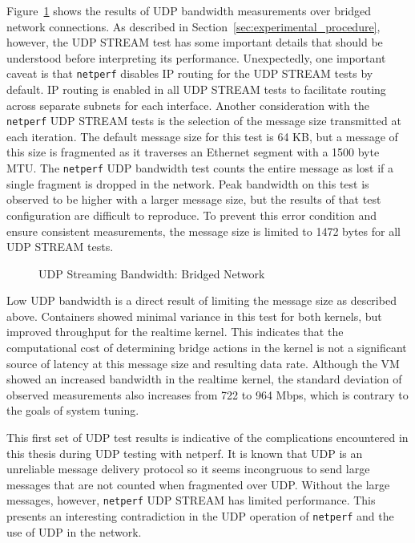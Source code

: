 Figure~\ref{fig:udp_stream_bridge} shows the results of UDP bandwidth measurements over bridged network connections.  
As described in Section~\ref{sec:experimental_procedure}, however, the UDP STREAM test has some important details that should be understood before interpreting its performance.
Unexpectedly, one important caveat is that \texttt{netperf} disables IP routing for the UDP STREAM tests by default.
IP routing is enabled in all UDP STREAM tests to facilitate routing across separate subnets for each interface.
Another consideration with the \texttt{netperf} UDP STREAM tests is the selection of the message size transmitted at each iteration.
The default message size for this test is 64 KB, but a message of this size is fragmented as it traverses an Ethernet segment with a 1500 byte MTU.
The \texttt{netperf} UDP bandwidth test counts the entire message as lost if a single fragment is dropped in the network.
Peak bandwidth on this test is observed to be higher with a larger message size, but the results of that test configuration are difficult to reproduce.  
To prevent this error condition and ensure consistent measurements, the message size is limited to 1472 bytes for all UDP STREAM tests.

\begin{figure}
    \centering
    \def\svgwidth{\columnwidth}
    
    \caption{UDP Streaming Bandwidth: Bridged Network}
    \label{fig:udp_stream_bridge}
\end{figure}

Low UDP bandwidth is a direct result of limiting the message size as described above.
Containers showed minimal variance in this test for both kernels, but improved throughput for the realtime kernel.  
This indicates that the computational cost of determining bridge actions in the kernel is not a significant source of latency at this message size and resulting data rate.
Although the VM showed an increased bandwidth in the realtime kernel, the standard deviation of observed measurements also increases from 722 to 964 Mbps, which is contrary to the goals of system tuning. 

This first set of UDP test results is indicative of the complications encountered in this thesis during UDP testing with netperf.
It is known that UDP is an unreliable message delivery protocol so it seems incongruous to send large messages that are not counted when fragmented over UDP.
Without the large messages, however, \texttt{netperf} UDP STREAM has limited performance. 
This presents an interesting contradiction in the UDP operation of \texttt{netperf} and the use of UDP in the network.


